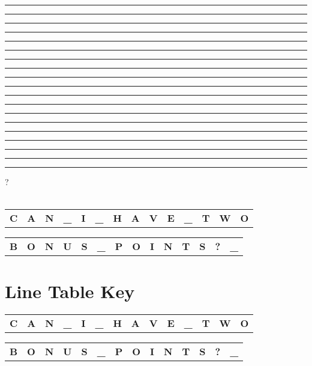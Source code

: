 \documentclass[12pt]{article}
\begin{document}
\noindent \rule{0.3cm}{0.4pt} \rule{0.3cm}{0.4pt} \rule{0.3cm}{0.4pt} \quad \rule{0.3cm}{0.4pt} \quad \rule{0.3cm}{0.4pt} \rule{0.3cm}{0.4pt} \rule{0.3cm}{0.4pt} \rule{0.3cm}{0.4pt} \quad \rule{0.3cm}{0.4pt} \rule{0.3cm}{0.4pt} \rule{0.3cm}{0.4pt} \rule{0.3cm}{0.4pt} \rule{0.3cm}{0.4pt} \quad \rule{0.3cm}{0.4pt} \rule{0.3cm}{0.4pt} \rule{0.3cm}{0.4pt} \rule{0.3cm}{0.4pt} \rule{0.3cm}{0.4pt} \rule{0.3cm}{0.4pt} \quad ?
\\\\
\noindent %
\begin{tabular}{|*{14}{W|}} 
\hline
& & & & & & & & & & & & & \\
\hline
\textbf{C} & \textbf{A} & \textbf{N} & \textbf{\_} & \textbf{I} & \textbf{\_} & \textbf{H} & \textbf{A} & \textbf{V} & \textbf{E} & \textbf{\_} & \textbf{T} & \textbf{W} & \textbf{O} \\
\hline
\end{tabular}

\vspace{1em} %

\noindent
\begin{tabular}{|*{14}{W|}} 
\hline
& & & & & & & & & & & & & \\
\hline
\textbf{B} & \textbf{O} & \textbf{N} & \textbf{U} & \textbf{S} & \textbf{\_} & \textbf{P} & \textbf{O} & \textbf{I} & \textbf{N} & \textbf{T} & \textbf{S} & \textbf{?} & \textbf{\_} \\
\hline
\end{tabular}

\section*{Line Table Key}
\begin{tabular}{|*{14}{W|}} 
\hline
& & & & & & & & & & & & & \\
\hline
\textbf{C} & \textbf{A} & \textbf{N} & \textbf{\_} & \textbf{I} & \textbf{\_} & \textbf{H} & \textbf{A} & \textbf{V} & \textbf{E} & \textbf{\_} & \textbf{T} & \textbf{W} & \textbf{O} \\
\hline
\end{tabular}

\vspace{1em} %

\noindent
\begin{tabular}{|*{14}{W|}} 
\hline
& & & & & & & & & & & & & \\
\hline
\textbf{B} & \textbf{O} & \textbf{N} & \textbf{U} & \textbf{S} & \textbf{\_} & \textbf{P} & \textbf{O} & \textbf{I} & \textbf{N} & \textbf{T} & \textbf{S} & \textbf{?} & \textbf{\_} \\
\hline
\end{tabular}
\end{document}

